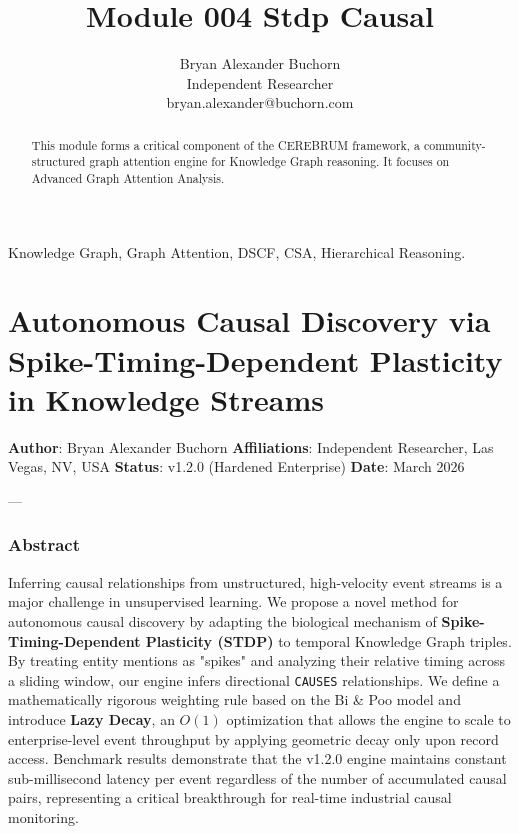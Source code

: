 \documentclass[10pt,journal,compsoc]{IEEEtran}
\begin{document}
\title{Module 004 Stdp Causal}
\author{Bryan Alexander Buchorn \\ Independent Researcher \\ bryan.alexander@buchorn.com}

\maketitle

\begin{abstract}
This module forms a critical component of the CEREBRUM framework, a community-structured graph attention engine for Knowledge Graph reasoning. It focuses on Advanced Graph Attention Analysis.
\end{abstract}

\begin{IEEEkeywords}
Knowledge Graph, Graph Attention, DSCF, CSA, Hierarchical Reasoning.
\end{IEEEkeywords}

\section{Autonomous Causal Discovery via Spike-Timing-Dependent Plasticity in Knowledge Streams}

\textbf{Author}: Bryan Alexander Buchorn  
\textbf{Affili\-ations}: Independent Researcher, Las Vegas, NV, USA  
\textbf{Status}: v1.2.0 (Hardened Enterprise)  
\textbf{Date}: March 2026

---

\subsubsection{Abstract}
Inferring causal relat\-ionships from unstr\-uctured, high-velocity event streams is a major challenge in unsup\-ervised learning. We propose a novel method for autonomous causal discovery by adapting the biological mechanism of \textbf{Spike-Timing-Dependent Plasticity (STDP)} to temporal Knowledge Graph triples. By treating entity mentions as "spikes" and analyzing their relative timing across a sliding window, our engine infers directional \texttt{CAUSES} relat\-ionships. We define a mathe\-matically rigorous weighting rule based on the Bi \& Poo \cite{bipoo1998} model and introduce \textbf{Lazy Decay}, an $O(1)$ optim\-ization that allows the engine to scale to enterprise-level event throughput by applying geometric decay only upon record access. Benchmark results demonstrate that the v1.2.0 engine maintains constant sub-millisecond latency per event regardless of the number of accumulated causal pairs, repre\-senting a critical break\-through for real-time industrial causal monitoring.
\end{document}
